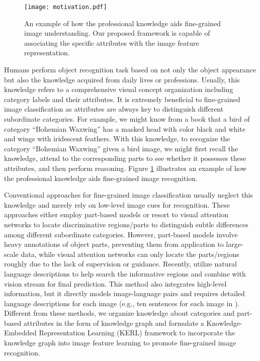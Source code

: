 \documentclass{article}
\begin{document}
\begin{figure}[!t]
   \centering
   \texttt{[image: motivation.pdf]} %
   \caption{An example of how the professional knowledge aids fine-grained image understanding. Our proposed framework is capable of associating the specific attributes with the image feature representation.}
   \vspace{-12pt}
   \label{fig:knowledge}
\end{figure}
Humans perform object recognition task based on not only the object appearance but also the knowledge acquired from daily lives or professions. Usually, this knowledge refers to a comprehensive visual concept organization including category labels and their attributes. It is extremely beneficial to fine-grained image classification as attributes are always key to distinguish different subordinate categories. For example, we might know from a book that a bird of category ``Bohemian Waxwing'' has a masked head with color black and white and wings with iridescent feathers. With this knowledge, to recognize the category ``Bohemian Waxwing'' given a bird image, we might first recall the knowledge, attend to the corresponding parts to see whether it possesses these attributes, and then perform reasoning. Figure \ref{fig:knowledge} illustrates an example of how the professional knowledge aids fine-grained image recognition.

Conventional approaches for fine-grained image classification usually neglect this knowledge and merely rely on low-level image cues for recognition. These approaches either employ part-based models \cite{zhang2014part} or resort to visual attention networks \cite{liu2016fully} to locate discriminative regions/parts to distinguish subtle differences among different subordinate categories. However, part-based models involve heavy annotations of object parts, preventing them from application to large-scale data, while visual attention networks can only locate the parts/regions roughly due to the lack of supervision or guidance. Recently, \cite{he2017fine} utilize natural language descriptions to help search the informative regions and combine with vision stream for final prediction. This method also integrates high-level information, but it directly models image-language pairs and requires detailed language descriptions for each image (e.g., ten sentences for each image in  \cite{he2017fine}). Different from these methods, we organize knowledge about categories and part-based attributes in the form of knowledge graph and formulate a Knowledge-Embedded Representation Learning (KERL) framework to incorporate the knowledge graph into image feature learning to promote fine-grained image recognition.
\end{document}
